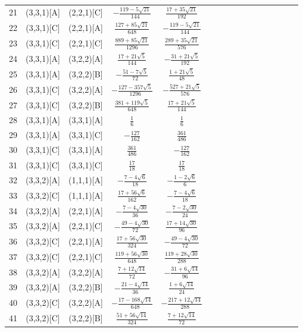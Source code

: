 \documentclass[11pt]{article}
\begin{document}
\begin{longtable}{ | p{1cm}| *{15}{c|} }
21 & (3,3,1)[A] & (2,2,1)[C] & $-\frac{119-5\sqrt{21}}{144}$ & $\frac{17+35\sqrt{21}}{192}$\\
22 & (3,3,1)[C] & (2,2,1)[A] & $\frac{127+85\sqrt{21}}{648}$ & $-\frac{119-5\sqrt{21}}{144}$\\
23 & (3,3,1)[C] & (2,2,1)[C] & $\frac{889+85\sqrt{21}}{1296}$ & $\frac{289+35\sqrt{21}}{576}$\\
24 & (3,3,1)[A] & (3,2,2)[A] & $\frac{17+21\sqrt{5}}{144}$ & $-\frac{31+21\sqrt{5}}{192}$\\
25 & (3,3,1)[A] & (3,2,2)[B] & $-\frac{51-7\sqrt{5}}{72}$ & $\frac{1+21\sqrt{5}}{48}$\\
26 & (3,3,1)[C] & (3,2,2)[A] & $-\frac{127-357\sqrt{5}}{1296}$ & $-\frac{527+21\sqrt{5}}{576}$\\
27 & (3,3,1)[C] & (3,2,2)[B] & $\frac{381+119\sqrt{5}}{648}$ & $\frac{17+21\sqrt{5}}{144}$\\
28 & (3,3,1)[A] & (3,3,1)[A] & $\frac{1}{6}$ & $\frac{1}{6}$\\
29 & (3,3,1)[A] & (3,3,1)[C] & $-\frac{127}{162}$ & $\frac{361}{486}$\\
30 & (3,3,1)[C] & (3,3,1)[A] & $\frac{361}{486}$ & $-\frac{127}{162}$\\
31 & (3,3,1)[C] & (3,3,1)[C] & $\frac{17}{18}$ & $\frac{17}{18}$\\
32 & (3,3,2)[A] & (1,1,1)[A] & $-\frac{7-4\sqrt{6}}{18}$ & $-\frac{1-2\sqrt{6}}{6}$\\
33 & (3,3,2)[C] & (1,1,1)[A] & $\frac{17+56\sqrt{6}}{162}$ & $-\frac{7-4\sqrt{6}}{18}$\\
34 & (3,3,2)[A] & (2,2,1)[A] & $-\frac{7-4\sqrt{30}}{36}$ & $-\frac{7-2\sqrt{30}}{24}$\\
35 & (3,3,2)[A] & (2,2,1)[C] & $-\frac{49-4\sqrt{30}}{72}$ & $\frac{17+14\sqrt{30}}{96}$\\
36 & (3,3,2)[C] & (2,2,1)[A] & $\frac{17+56\sqrt{30}}{324}$ & $-\frac{49-4\sqrt{30}}{72}$\\
37 & (3,3,2)[C] & (2,2,1)[C] & $\frac{119+56\sqrt{30}}{648}$ & $\frac{119+28\sqrt{30}}{288}$\\
38 & (3,3,2)[A] & (3,2,2)[A] & $\frac{7+12\sqrt{14}}{72}$ & $-\frac{31+6\sqrt{14}}{96}$\\
39 & (3,3,2)[A] & (3,2,2)[B] & $-\frac{21-4\sqrt{14}}{36}$ & $\frac{1+6\sqrt{14}}{24}$\\
40 & (3,3,2)[C] & (3,2,2)[A] & $-\frac{17-168\sqrt{14}}{648}$ & $-\frac{217+12\sqrt{14}}{288}$\\
41 & (3,3,2)[C] & (3,2,2)[B] & $\frac{51+56\sqrt{14}}{324}$ & $\frac{7+12\sqrt{14}}{72}$\\

\end{longtable}
\end{document}
